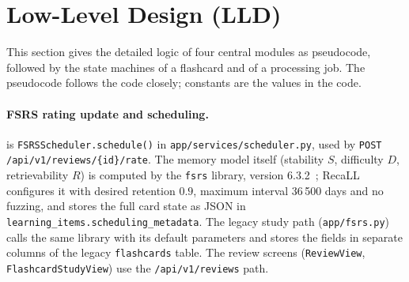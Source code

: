 
\section{Low-Level Design (LLD)}\label{sec:lld}

This section gives the detailed logic of four central modules as pseudocode, followed by
the state machines of a flashcard and of a processing job. The pseudocode follows the
code closely; constants are the values in the code.

\paragraph{FSRS rating update and scheduling.}
 is \texttt{FSRSScheduler.schedule()} in
\texttt{app/services/scheduler.py}, used by \texttt{POST /api/v1/reviews/\{id\}/rate}.
The memory model itself (stability $S$, difficulty $D$, retrievability
$R$) is computed by the \texttt{fsrs} library, version 6.3.2~\cite{ye2022fsrs,pyfsrs};
RecaLL configures it with desired retention $0.9$, maximum interval 36\,500 days and no
fuzzing, and stores the full card state as JSON in
\texttt{learning\_items.scheduling\_metadata}. The legacy study path
(\texttt{app/fsrs.py}) calls the same library with its default parameters and stores the
fields in separate columns of the legacy \texttt{flashcards} table. The review screens
(\texttt{ReviewView}, \texttt{FlashcardStudyView}) use the \texttt{/api/v1/reviews}
path.

